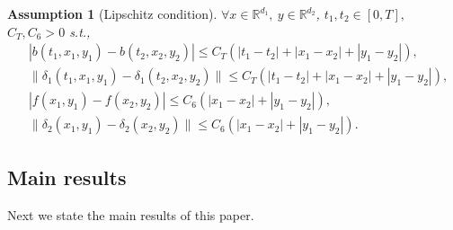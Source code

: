 \documentclass[11pt,reqno]{amsart}
\newtheorem{assumption}{\indent Assumption}[section]
\numberwithin{equation}{section}
\newcommand{\de}{\delta}
\begin{document}
\begin{assumption}[Lipschitz condition]\label{lip}
 $\forall x\in \mathbb{R}^{d_{1}},\ y\in \mathbb{R}^{d_{2}}$, $t_{1},t_{2}\in [0,T],$  $ C_{T},C_{6}>0$ s.t.,
\begin{align*}
	&|b(t_{1},x_{1},y_{1})-b(t_{2},x_{2},y_{2})| \leq C_{T}(|t_{1}-t_{2}|+|x_{1}-x_{2}|+|y_{1}-y_{2}|),\\
	&\|\de_1(t_{1},x_{1},y_{1})-\de_1(t_{2},x_{2},y_{2})\| \leq C_{T}(|t_{1}-t_{2}|+|x_{1}-x_{2}|+|y_{1}-y_{2}|),\\
	&|f(x_{1},y_{1})-f(x_{2},y_{2})| \leq C_{6}(|x_{1}-x_{2}|+|y_{1}-y_{2}|),
	\\
	&\|\de_2(x_{1},y_{1})-\de_2(x_{2},y_{2})\| \leq C_{6}(|x_{1}-x_{2}|+|y_{1}-y_{2}|).
\end{align*}
\end{assumption}

\subsection{Main results}
  Next we state the main results of this paper.
\end{document}
